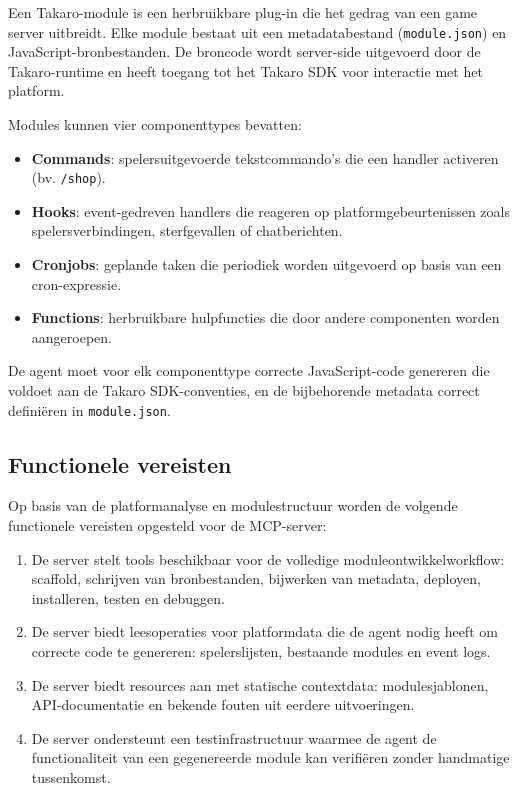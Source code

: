 Een Takaro-module is een herbruikbare plug-in die het gedrag van een game server uitbreidt. Elke module bestaat uit een metadatabestand (\texttt{module.json}) en JavaScript-bronbestanden. De broncode wordt server-side uitgevoerd door de Takaro-runtime en heeft toegang tot het Takaro SDK voor interactie met het platform.

Modules kunnen vier componenttypes bevatten:

\begin{itemize}
    \item \textbf{Commands}: spelersuitgevoerde tekstcommando’s die een handler activeren (bv. \texttt{/shop}).
    \item \textbf{Hooks}: event-gedreven handlers die reageren op platformgebeurtenissen zoals spelersverbindingen, sterfgevallen of chatberichten.
    \item \textbf{Cronjobs}: geplande taken die periodiek worden uitgevoerd op basis van een cron-expressie.
    \item \textbf{Functions}: herbruikbare hulpfuncties die door andere componenten worden aangeroepen.
\end{itemize}

De agent moet voor elk componenttype correcte JavaScript-code genereren die voldoet aan de Takaro SDK-conventies, en de bijbehorende metadata correct definiëren in \texttt{module.json}.

\subsection{Functionele vereisten}\label{subsec:functionele-vereisten}

Op basis van de platformanalyse en modulestructuur worden de volgende functionele vereisten opgesteld voor de MCP-server:

\begin{enumerate}
    \item De server stelt tools beschikbaar voor de volledige moduleontwikkelworkflow: scaffold, schrijven van bronbestanden, bijwerken van metadata, deployen, installeren, testen en debuggen.
    \item De server biedt leesoperaties voor platformdata die de agent nodig heeft om correcte code te genereren: spelerslijsten, bestaande modules en event logs.
    \item De server biedt resources aan met statische contextdata: modulesjablonen, API-documentatie en bekende fouten uit eerdere uitvoeringen.
    \item De server ondersteunt een testinfrastructuur waarmee de agent de functionaliteit van een gegenereerde module kan verifiëren zonder handmatige tussenkomst.
\end{enumerate}

